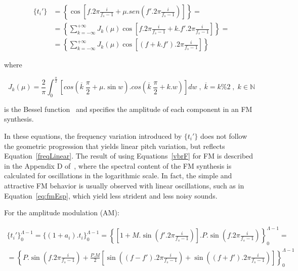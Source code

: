 \begin{equation}\label{eq:fmEsp}
\begin{split}
\{t_i'\} & = \left \{ \cos \left [f . 2 \pi \frac{i}{f_s-1} + \mu . sen \left ( f' . 2 \pi \frac{i}{ f_s -1 } \right ) \right ] \right \} = \\
 & = \left \{ \sum_{k=-\infty}^{+\infty} J_k(\mu) \cos \left [ f . 2 \pi \frac{i}{f_s-1} + k . f' . 2 \pi \frac{i}{f_s-1} \right ]  \right \} = \\
 & = \left \{ \sum_{k=-\infty}^{+\infty} J_k(\mu) \cos \left [ (f+k.f') . 2 \pi \frac{i}{f_s-1} \right ]  \right \}
\end{split}
\end{equation}

\noindent where

\begin{equation}\label{eq:Bessel}
J_k(\mu) = \frac{2}{\pi} \int_0^{\frac{\pi}{2}}\left [ cos \left (\overline{k}\;\frac{\pi}{2} + \mu . \sin w \right ) . cos \left ( \overline{k}\;\frac{\pi}{2} + k . w \right ) \right ] dw \;,\; \overline{k} = k \% 2 \;,\; k \in \mathbb{N}
\end{equation}

\noindent is the Bessel function~\cite{BesselCCRMA,JOSFM} and specifies the amplitude of each component in an FM synthesis.

In these equations, the frequency variation introduced by $\{t_i'\}$ does not follow the geometric progression that yields linear pitch variation, but reflects Equation~\ref{freqLinear}.
The result of using Equations~\ref{vbrF} for FM is described in the Appendix D of~\cite{dissertacao}, where the spectral content of the FM synthesis is calculated for oscillations in the logarithmic scale. In fact, the simple and attractive FM behavior is usually observed with linear oscillations, such as in Equation~\ref{eq:fmEsp}, which yield less strident and less noisy sounds.

For the amplitude modulation (AM):

\begin{equation}\label{eq:specAM}
\begin{split}
\{t_i'\}_0^{\Lambda-1} =\{(1+a_i) . t_i\}_0^{\Lambda-1} = \left \{ \left [ 1+M.\sin \left ( f'.2\pi\frac{i}{f_s -1} \right ) \right] .P .\sin \left ( f.2\pi\frac{i}{f_s -1} \right ) \right \}_0^{\Lambda-1} = \\ 
                        =  \left\{P.\sin \left( f.2\pi\frac{i}{f_s -1}  \right ) +  \frac{P.M}{2} \left [ \sin \left( (f-f').2\pi\frac{i}{f_s -1}  \right )  + \sin \left( (f+f').2\pi\frac{i}{f_s -1}  \right ) \right ] \right \}_0^{\Lambda-1}
\end{split}
\end{equation}

